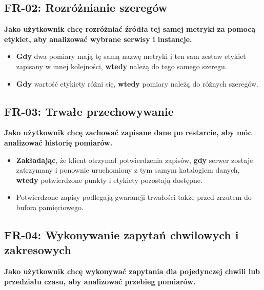\documentclass[12pt,a4paper]{article}
\begin{document}
\subsection*{FR-02: Rozróżnianie szeregów}

\textbf{Jako użytkownik chcę rozróżniać źródła tej samej metryki za pomocą etykiet, aby analizować wybrane serwisy i instancje.}

\begin{itemize}
    \item \textbf{Gdy} dwa pomiary mają tę samą nazwę metryki i ten sam zestaw etykiet zapisany w innej kolejności, \textbf{wtedy} należą do tego samego szeregu.
    \item \textbf{Gdy} wartość etykiety różni się, \textbf{wtedy} pomiary należą do różnych szeregów.
\end{itemize}


\subsection*{FR-03: Trwałe przechowywanie}

\textbf{Jako użytkownik chcę zachować zapisane dane po restarcie, aby móc analizować historię pomiarów.}

\begin{itemize}
    \item \textbf{Zakładając}, że klient otrzymał potwierdzenia zapisów, \textbf{gdy} serwer zostaje zatrzymany i ponownie uruchomiony z tym samym katalogiem danych, \textbf{wtedy} potwierdzone punkty i etykiety pozostają dostępne.
    \item Potwierdzone zapisy podlegają gwarancji trwałości także przed zrzutem do bufora pamięciowego.
\end{itemize}


\subsection*{FR-04: Wykonywanie zapytań chwilowych i zakresowych}

\textbf{Jako użytkownik chcę wykonywać zapytania dla pojedynczej chwili lub przedziału czasu, aby analizować przebieg pomiarów.}
\end{document}
